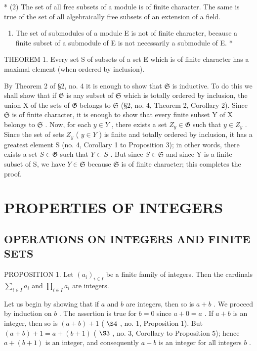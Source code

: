 * (2) The set of all free subsets of a module is of finite character. The same is true of the set of all algebraically free subsets of an extension of a field.

\begin{enumerate}
\def\labelenumi{(\arabic{enumi})}
\setcounter{enumi}{2}
\tightlist
\item
  The set of submodules of a module E is not of finite character, because a finite subset of a submodule of E is not necessarily a submodule of E. *
\end{enumerate}

THEOREM 1. Every set S of subsets of a set E which is of finite character has a maximal element (when ordered by inclusion).

By Theorem 2 of §2, no. 4 it is enough to show that \(\mathfrak{S}\) is inductive. To do this we shall show that if \(\mathfrak{G}\) is any subset of \(\mathfrak{S}\) which is totally ordered by inclusion, the union X of the sets of \(\mathfrak{G}\) belongs to \(\mathfrak{S}\) (§2, no. 4, Theorem 2, Corollary 2). Since \(\mathfrak{S}\) is of finite character, it is enough to show that every finite subset Y of X belongs to \(\mathfrak{S}\) . Now, for each \(y \in Y\) , there exists a set \(Z_y \in \mathfrak{G}\) such that \(y \in Z_y\) . Since the set of sets \(Z_y\) ( \(y \in Y\) ) is finite and totally ordered by inclusion, it has a greatest element S (no. 4, Corollary 1 to Proposition 3); in other words, there exists a set \(S \in \mathfrak{G}\) such that \(Y \subset S\) . But since \(S \in \mathfrak{S}\) and since Y is a finite subset of S, we have \(Y \in \mathfrak{S}\) because \(\mathfrak{S}\) is of finite character; this completes the proof.

\section{PROPERTIES OF INTEGERS}

\subsection{OPERATIONS ON INTEGERS AND FINITE SETS}

PROPOSITION 1. Let \((a_i)_{i\in I}\) be a finite family of integers. Then the cardinals \(\sum_{i\in I}a_i\) and \(\prod_{i\in I}a_i\) are integers.

Let us begin by showing that if \(a\) and \(b\) are integers, then so is \(a + b\) . We proceed by induction on \(b\) . The assertion is true for \(b = 0\) since \(a + 0 = a\) . If \(a + b\) is an integer, then so is \((a + b) + 1\) ( \(\S 4\) , no. 1, Proposition 1). But \((a + b) + 1 = a + (b + 1)\) ( \(\S 3\) , no. 3, Corollary to Proposition 5); hence \(a + (b + 1)\) is an integer, and consequently \(a + b\) is an integer for all integers \(b\) .

